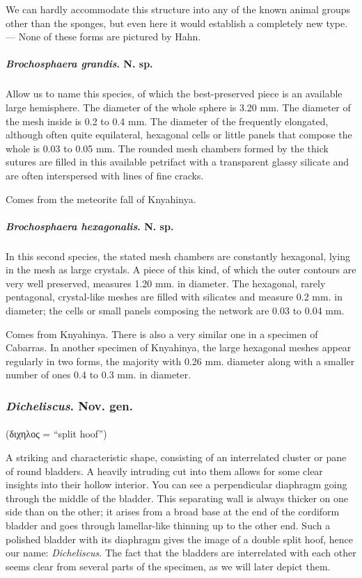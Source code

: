 \documentclass[a4paper, 12pt, oneside]{article}
\begin{document}
We can hardly accommodate this structure into any of the known animal groups other than the sponges, but even here it would establish a completely new type. --- None of these forms are pictured by Hahn.
\paragraph{\emph{Brochosphaera grandis}. N. sp.}
\subparagraph{}
Allow us to name this species, of which the best-preserved piece is an available large hemisphere. The diameter of the whole sphere is 3.20 mm. The diameter of the mesh inside is 0.2 to 0.4 mm. The diameter of the frequently elongated, although often quite equilateral, hexagonal cells or little panels that compose the whole is 0.03 to 0.05 mm. The rounded mesh chambers formed by the thick sutures are filled in this available petrifact with a transparent glassy silicate and are often interspersed with lines of fine cracks.

Comes from the meteorite fall of Knyahinya.
\paragraph{\emph{Brochosphaera hexagonalis}. N. sp.}
\subparagraph{}
In this second species, the stated mesh chambers are constantly hexagonal, lying in the mesh as large crystals. A piece of this kind, of which the outer contours are very well preserved, measures 1.20 mm. in diameter. The hexagonal, rarely pentagonal, crystal-like meshes are filled with silicates and measure 0.2 mm. in diameter; the cells or small panels composing the network are 0.03 to 0.04 mm.

Comes from Knyahinya. There is also a very similar one in a specimen of Cabarras. In another specimen of Knyahinya, the large hexagonal meshes appear regularly in two forms, the majority with 0.26 mm. diameter along with a smaller number of ones 0.4 to 0.3 mm. in diameter.
\subsubsection{\emph{Dicheliscus}. Nov. gen.}
\paragraph*{}
(διχηλος = ``split hoof'')%

A striking and characteristic shape, consisting of an interrelated cluster or pane of round bladders. A heavily intruding cut into them allows for some clear insights into their hollow interior. You can see a perpendicular diaphragm going through the middle of the bladder. This separating wall is always thicker on one side than on the other; it arises from a broad base at the end of the cordiform bladder and goes through lamellar-like thinning up to the other end. Such a polished bladder with its diaphragm gives the image of a double split hoof, hence our name: \emph{Dicheliscus}. The fact that the bladders are interrelated with each other seems clear from several parts of the specimen, as we will later depict them.
\end{document}
